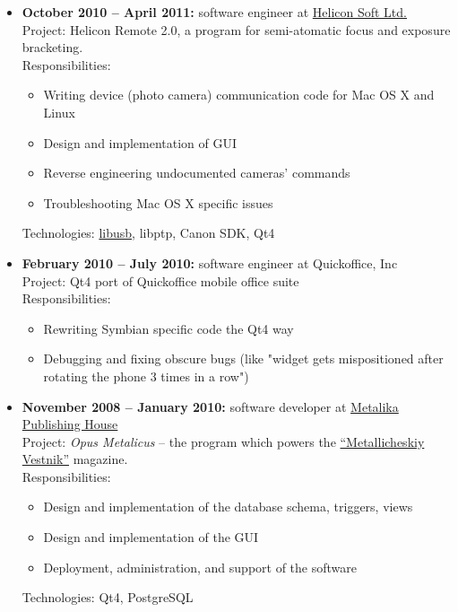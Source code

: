 \documentclass{report}
\begin{document}
\begin{itemize}
\item {\bf October 2010 -- April 2011:} software engineer at
  \href{http://www.heliconsoft.com}{Helicon Soft Ltd.} \\
  Project:
  Helicon Remote 2.0, a program for semi-atomatic focus and exposure bracketing.\\
  Responsibilities:
     \begin{itemize}
       \item Writing device (photo camera) communication code for Mac OS X and Linux
       \item Design and implementation of GUI
       \item Reverse engineering undocumented cameras' commands
       \item Troubleshooting Mac OS X specific issues
    \end{itemize}
    Technologies: \href{http://www.libusb.org}{libusb}, libptp, Canon SDK, Qt4

\item {\bf February 2010 -- July 2010:} software engineer at Quickoffice, Inc \\
  Project: Qt4 port of Quickoffice mobile office suite  \\
  Responsibilities:
    \begin{itemize}
      \item Rewriting Symbian specific code the Qt4 way
      \item Debugging and fixing obscure bugs (like "widget gets mispositioned
            after rotating the phone 3 times in a row")
    \end{itemize}

\item {\bf November 2008 -- January 2010:} software developer at
  \href{http://www.metalika.ua}{Metalika Publishing House} \\
  Project:
    {\it Opus Metalicus} -- the program which powers the
    \href{http://www.metalika.ua/metallicheskii-vestnik.html}{``Metallicheskiy Vestnik''}
    magazine. \\
    Responsibilities:
    \begin{itemize}
      \item Design and implementation of the database schema, triggers, views
      \item Design and implementation of the GUI
      \item Deployment, administration, and support of the software
    \end{itemize}
    Technologies: Qt4, PostgreSQL


\end{itemize}
\end{document}

